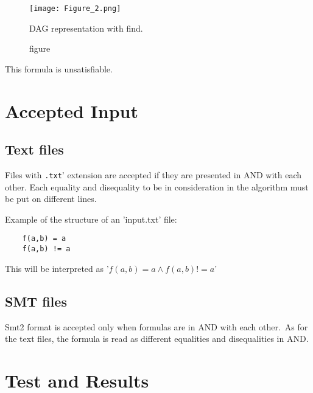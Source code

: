 \documentclass[11pt]{article}
\begin{document}
\begin{figure}[!htbp]
    \centering
    \texttt{[image: Figure\_2.png]}
    \caption{figure}{DAG representation with find.}
    \label{fig:enter-label}
\end{figure}

This formula is unsatisfiable.
\section{Accepted Input}

\subsection{Text files}

Files with \texttt{.txt}' extension are accepted if they are presented in AND with each other.
Each equality and disequality to be in consideration in the algorithm must be put on different lines.

Example of the structure of an 'input.txt' file:

\begin{verbatim}
    f(a,b) = a
    f(a,b) != a
\end{verbatim}

This will be interpreted as '$f(a,b) = a \land f(a,b) != a$'

\subsection{SMT files}

Smt2 format is accepted only when formulas are in AND with each other.\
As for the text files, the formula is read as different equalities and disequalities in AND.

\section{Test and Results}
\end{document}
